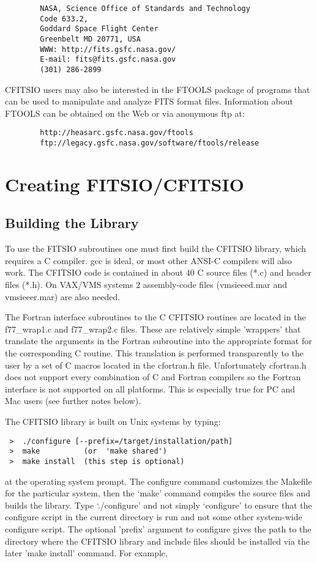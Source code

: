 \documentclass[11pt]{book}
\begin{document}
\begin{verbatim}
        NASA, Science Office of Standards and Technology
        Code 633.2,
        Goddard Space Flight Center
        Greenbelt MD 20771, USA
        WWW: http://fits.gsfc.nasa.gov/
        E-mail: fits@fits.gsfc.nasa.gov
        (301) 286-2899
\end{verbatim}
CFITSIO users may also be interested in the FTOOLS package of programs
that can be used to manipulate and analyze FITS format files.
Information about FTOOLS can be obtained on the Web or via anonymous
ftp at:

\begin{verbatim}
        http://heasarc.gsfc.nasa.gov/ftools
        ftp://legacy.gsfc.nasa.gov/software/ftools/release
\end{verbatim}

\chapter{ Creating FITSIO/CFITSIO }


\section{Building the Library}

To use the FITSIO subroutines one must first build the CFITSIO library,
which requires a C compiler. gcc is ideal, or most other ANSI-C
compilers will also work.  The CFITSIO code is contained in about 40 C
source files (*.c) and header files (*.h). On VAX/VMS systems 2
assembly-code files (vmsieeed.mar and vmsieeer.mar) are also needed.

The Fortran interface subroutines to the C CFITSIO routines are located
in the f77\_wrap1.c and f77\_wrap2.c files.  These are relatively simple
'wrappers' that translate the arguments in the Fortran subroutine into
the appropriate format for the corresponding C routine.  This
translation is performed transparently to the user by a set of C macros
located in the cfortran.h file.  Unfortunately cfortran.h does not
support every combination of C and Fortran compilers so the Fortran
interface is not supported on all platforms.  This is especially true
for PC and Mac users (see further notes below).

The CFITSIO library is built on Unix systems by typing:

\begin{verbatim}
 >  ./configure [--prefix=/target/installation/path]
 >  make          (or  'make shared')
 >  make install  (this step is optional)
\end{verbatim}
at the operating system prompt.  The configure command customizes the
Makefile for the particular system, then the `make' command compiles the
source files and builds the library.  Type `./configure' and not simply
`configure' to ensure that the configure script in the current directory
is run and not some other system-wide configure script.  The optional
'prefix' argument to configure gives the path to the directory where
the CFITSIO library and include files should be installed via the later
'make install' command. For example,
\end{document}

